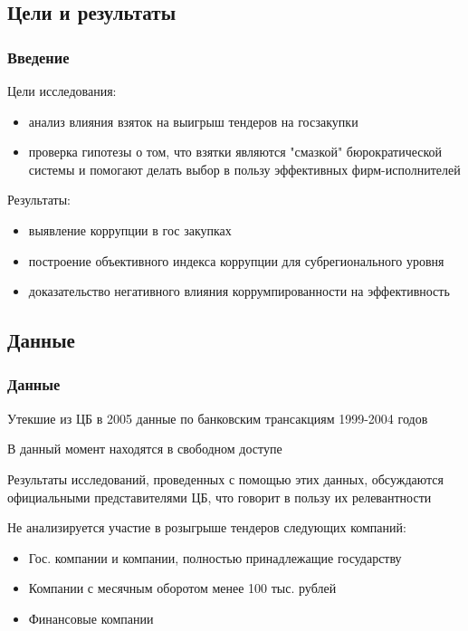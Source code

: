\subsection{Цели и результаты}

\begin{frame}

\frametitle{Введение}
Цели исследования:\\ 

\begin{itemize}
\item анализ влияния взяток на выигрыш тендеров на госзакупки

\item проверка гипотезы о том, 
что взятки являются "смазкой" бюрократической системы и помогают делать выбор в пользу
эффективных фирм-исполнителей
\end{itemize}

\vspace{5mm}

Результаты:
\begin{itemize}

\item выявление коррупции в гос закупках

\item построение объективного индекса
коррупции для субрегионального уровня

\item доказательство негативного влияния коррумпированности на
эффективность

\end{itemize}

\end{frame}



\subsection{Данные}

\begin{frame}

\frametitle{Данные}
Утекшие из ЦБ в 2005 данные по банковским трансакциям 1999-2004 годов
\vspace{3mm}

В данный момент находятся в свободном доступе
\vspace{3mm}

Результаты исследований, проведенных с помощью этих данных, 
обсуждаются официальными представителями ЦБ,
что говорит в пользу их релевантности
\vspace{3mm}

Не анализируется участие в розыгрыше тендеров следующих компаний:
\begin{itemize}
\item Гос. компании и компании, полностью принадлежащие государству
\item Компании с месячным оборотом менее 100 тыс. рублей
\item Финансовые компании
\end{itemize}

\end{frame}